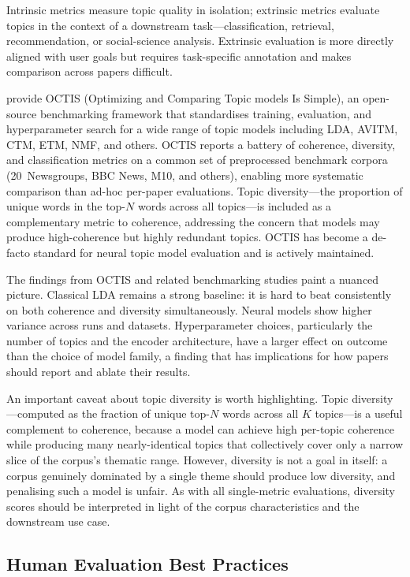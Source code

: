 \documentclass[11pt,a4paper]{article}
\begin{document}
Intrinsic metrics measure topic quality in isolation; extrinsic metrics
evaluate topics in the context of a downstream task---classification,
retrieval, recommendation, or social-science analysis.
Extrinsic evaluation is more directly aligned with user goals but
requires task-specific annotation and makes comparison across papers
difficult.

\textcite{terragni2021octis} provide OCTIS (Optimizing and Comparing
Topic models Is Simple), an open-source benchmarking framework that
standardises training, evaluation, and hyperparameter search for a
wide range of topic models including LDA, AVITM, CTM, ETM, NMF, and
others.
OCTIS reports a battery of coherence, diversity, and classification
metrics on a common set of preprocessed benchmark corpora (20~Newsgroups,
BBC News, M10, and others), enabling more systematic comparison than
ad-hoc per-paper evaluations.
Topic diversity---the proportion of unique words in the top-$N$ words
across all topics---is included as a complementary metric to coherence,
addressing the concern that models may produce high-coherence but highly
redundant topics.
OCTIS has become a de-facto standard for neural topic model evaluation
and is actively maintained.

The findings from OCTIS and related benchmarking studies paint a
nuanced picture.
Classical LDA remains a strong baseline: it is hard to beat
consistently on both coherence and diversity simultaneously.
Neural models show higher variance across runs and datasets.
Hyperparameter choices, particularly the number of topics and
the encoder architecture, have a larger effect on outcome than the
choice of model family, a finding that has implications for how papers
should report and ablate their results.

An important caveat about topic diversity is worth highlighting.
Topic diversity---computed as the fraction of unique top-$N$ words
across all $K$ topics---is a useful complement to coherence, because
a model can achieve high per-topic coherence while producing many
nearly-identical topics that collectively cover only a narrow slice of
the corpus's thematic range.
However, diversity is not a goal in itself: a corpus genuinely dominated
by a single theme should produce low diversity, and penalising such
a model is unfair.
As with all single-metric evaluations, diversity scores should be
interpreted in light of the corpus characteristics and the downstream
use case.

\subsection{Human Evaluation Best Practices}
\label{sec:eval-human}
\end{document}
